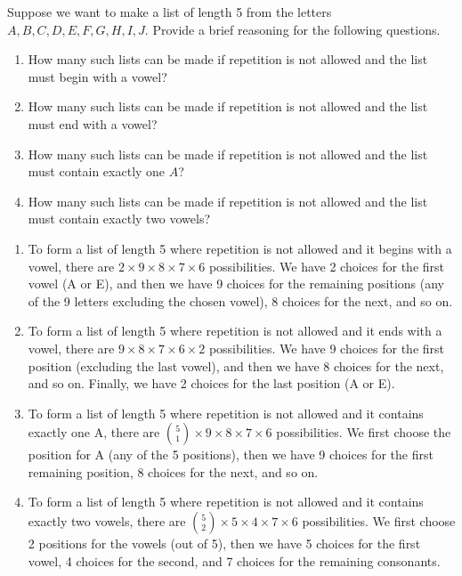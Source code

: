 \documentclass{article}
\theoremstyle{definition}
\begin{document}
\begin{question}
    Suppose we want to make a list of length 5 from the letters $A, B, C, D, E, F, G, H, I, J$. Provide a brief reasoning for the following questions.
        \begin{enumerate}
            \item How many such lists can be made if repetition is not allowed and the list must begin with a vowel?
            \item How many such lists can be made if repetition is not allowed and the list must end with a vowel?
            \item How many such lists can be made if repetition is not allowed and the list must contain exactly one $A$?
            \item How many such lists can be made if repetition is not allowed and the list must contain exactly two vowels?
        \end{enumerate}
\end{question}
\begin{solution}
    \begin{enumerate}
        \item To form a list of length 5 where repetition is not allowed and it begins with a vowel, there are $2 \times 9 \times 8 \times 7 \times 6$ possibilities. We have 2 choices for the first vowel (A or E), and then we have 9 choices for the remaining positions (any of the 9 letters excluding the chosen vowel), 8 choices for the next, and so on.
        \item To form a list of length 5 where repetition is not allowed and it ends with a vowel, there are $9 \times 8 \times 7 \times 6 \times 2$ possibilities. We have 9 choices for the first position (excluding the last vowel), and then we have 8 choices for the next, and so on. Finally, we have 2 choices for the last position (A or E).
        \item To form a list of length 5 where repetition is not allowed and it contains exactly one A, there are ${5 \choose 1} \times 9 \times 8 \times 7 \times 6$ possibilities. We first choose the position for A (any of the 5 positions), then we have 9 choices for the first remaining position, 8 choices for the next, and so on.
        \item To form a list of length 5 where repetition is not allowed and it contains exactly two vowels, there are ${5 \choose 2} \times 5 \times 4 \times 7 \times 6$ possibilities. We first choose 2 positions for the vowels (out of 5), then we have 5 choices for the first vowel, 4 choices for the second, and 7 choices for the remaining consonants.
    \end{enumerate}
\end{solution}
\end{document}
